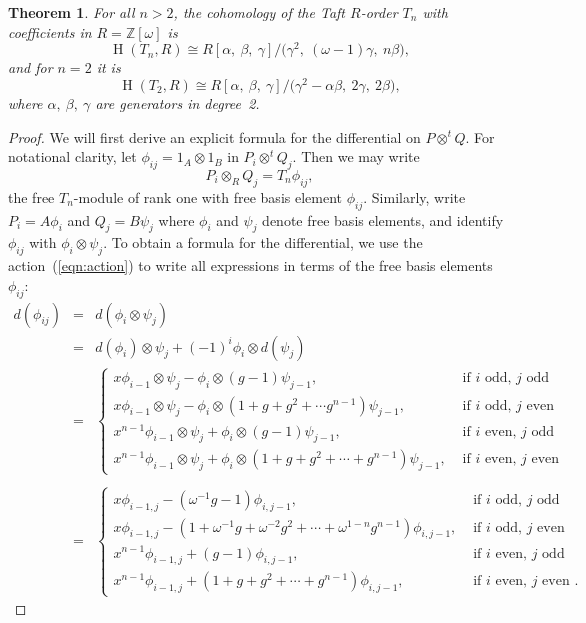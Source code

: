 \documentclass[11pt]{amsart}
\numberwithin{equation}{section}
\newtheorem{theorem}[equation]{Theorem}
\theoremstyle{definition}
\theoremstyle{remark}
\newcommand{\Z}{\mathbb{Z}}
\newcommand{\om}{\omega}
\newcommand\Homol{\operatorname{H}}
\newcommand\coh{\Homol}
\newcommand\ot{\otimes}
\newcommand\ott{\otimes^{t}\!}
\begin{document}
\begin{theorem}\label{thm:Taft-cup}
For all $n>2$, the cohomology of the Taft $R$-order $T_n$
with coefficients in $R = \Z[\omega]$ is 
\[
      \coh(T_n,R)\cong R [ \alpha,\ \beta,\ \gamma ] /
     \big( \gamma^2 , \ (\omega -1)\gamma , \ n\beta \big) ,
\]
and for $n=2$ it is 
\[
  \coh(T_2,R)\cong R [ \alpha, \ \beta, \ \gamma ] /
     \big( \gamma^2 - \alpha\beta, \ 2\gamma, \ 2\beta \big) ,
\] 
where $\alpha, \ \beta, \ \gamma$ are generators in degree~2.
\end{theorem} 

\begin{proof}
We will first derive an explicit formula for the differential on
$P\ott Q$. 
For notational clarity, let $\phi_{ij} = 1_A\ot 1_B$ in $P_i\ott Q_j$.
Then we may write
\[
  P_i\ot_R Q_j = T_n \phi_{ij} ,
\]
the free $T_n$-module of rank one with free basis element $\phi_{ij}$. 
Similarly, write
$P_i=A\phi_i$ and $Q_j=B\psi_j$ where
$\phi_i$ and $\psi_j$ denote free basis elements, 
and identify $\phi_{ij}$ with $\phi_i \ot \psi_j$. 
To obtain a formula for the differential,
we use the action~(\ref{eqn:action})
to write all expressions in terms of the free basis elements $\phi_{ij}$:
\begin{eqnarray*}
d(\phi_{ij})&=& d(\phi_{i}\ot\psi_j) \\
&=& d(\phi_{i})\ot\psi_j + (-1)^{i} \phi_{i}\ot d(\psi_j)\\
  &=&    \left\{  \begin{array}{ll} 
     x\phi_{i-1}\ot \psi_j - \phi_i\ot (g-1)\psi_{j-1} , &
       \mbox{ if $i$ odd, $j$ odd }\\
     x\phi_{i-1}\ot\psi_j - \phi_i\ot (1+g+g^2+\cdots g^{n-1})\psi_{j-1} ,
   & \mbox{ if $i$ odd, $j$ even } \\
  x^{n-1}\phi_{i-1}\ot \psi_j + \phi_i\ot (g-1)\psi_{j-1} ,
   & \mbox{ if $i$ even, $j$ odd } \\
   x^{n-1}\phi_{i-1}\ot\psi_j + \phi_i\ot (1+g+g^2+\cdots +g^{n-1})
   \psi_{j-1} , & \mbox{ if $i$ even, $j$ even } 
  \end{array}\right.  \\
  & & \\ & = &
   \left\{\begin{array}{ll}
   x\phi_{i-1,j} - (\om^{-1}g -1) \phi_{i,j-1}, &
   \mbox{ if $i$ odd, $j$ odd } \\
  x\phi_{i-1,j} - (1+\om^{-1}g + \om^{-2}g^2 + \cdots + \om^{1-n}g^{n-1})
   \phi_{i,j-1}, &\mbox{ if $i$ odd, $j$ even }\\
  x^{n-1}\phi_{i-1,j} + (g-1)\phi_{i,j-1} , 
   & \mbox{ if $i$ even, $j$ odd }\\
  x^{n-1}\phi_{i-1,j} + (1+g+g^2+\cdots + g^{n-1})\phi_{i,j-1},
  &\mbox{ if $i$ even, $j$ even }.
  \end{array}\right.
\end{eqnarray*}


\end{proof}
\end{document}
